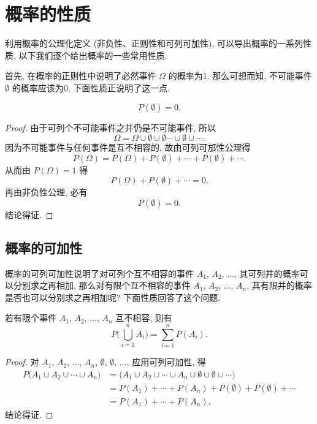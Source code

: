 \section{概率的性质}
利用概率的公理化定义 (非负性、正则性和可列可加性),
可以导出概率的一系列性质.
以下我们逐个给出概率的一些常用性质.

首先,
在概率的正则性中说明了必然事件 $\Omega$ 的概率为1.
那么可想而知,
不可能事件 $\emptyset$ 的概率应该为0,
下面性质正说明了这一点.

\begin{property}
  \[
    P (\emptyset) = 0.
  \]
\end{property}

\begin{proof}
  由于可列个不可能事件之并仍是不可能事件,
  所以
  \[
    \Omega = \Omega \cup \emptyset \cup \emptyset \dotsb \cup \emptyset \cup \dotsb.
  \]
  因为不可能事件与任何事件是互不相容的,
  故由可列可邡性公理得
  \[
    P (\Omega) = P (\Omega) + P (\emptyset) + \dotsb + P (\emptyset) + \dotsb.
  \]
  从而由 $P (\Omega) = 1$ 得
  \[
    P (\Omega) + P (\emptyset) + \dotsb = 0.
  \]
  再由非负性公理,
  必有
  \[
    P (\emptyset) = 0.
  \]
  结论得证.
\end{proof}

\subsection{概率的可加性}

概率的可列可加性说明了对可列个互不相容的事件 $A_1$, $A_2$, $\dotsc$,
其可列并的概率可以分别求之再相加,
那么对有限个互不相容的事件 $A_1$, $A_2$, $\dotsc$, $A_n$,
其有限并的概率是否也可以分别求之再相加呢?
下面性质回答了这个问题.

\begin{property}[有限可加性]\label{prop1.3.2}
  若有限个事件 $A_1$, $A_2$, $\dotsc$, $A_n$ 互不相容,
  则有
  \begin{equation}
    P \biggl( \bigcup _{i=1} ^n A_i \biggr) = \sum_{i=1}^n P (A_i).
    \label{eq1.3.1}
  \end{equation}
\end{property}

\begin{proof}
  对 $A_1$, $A_2$, $\dotsc$, $A_n$, $\emptyset$, $\emptyset$, $\dotsc$,
  应用可列可加性,
  得
  \begin{align*}
    P \biggl( A_1\cup A_2 \cup \cdots \cup A_n \biggr)
    &= \biggl(  A_1\cup A_2 \cup \cdots \cup A_n \cup \emptyset \cup \emptyset \cup \cdots\biggr)\\
    &= P(A_1) + \cdots + P(A_n) + P (\emptyset) + P(\emptyset) + \cdots\\
    &= P(A_1) + \cdots + P(A_n).
  \end{align*}
  结论得证.
\end{proof}

